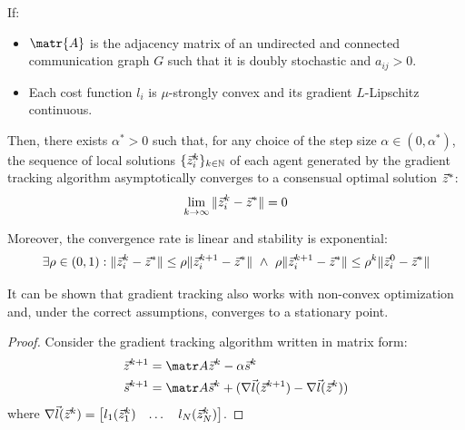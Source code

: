 \begin{description}



        \begin{theorem} 
            If:
            \begin{itemize}
                \item $\matr{A}$ is the adjacency matrix of an undirected and connected communication graph $G$ such that it is doubly stochastic and $a_{ij} > 0$.
                \item Each cost function $l_i$ is $\mu$-strongly convex and its gradient $L$-Lipschitz continuous.
            \end{itemize}
            Then, there exists $\alpha^* > 0$ such that, for any choice of the step size $\alpha \in (0, \alpha^*)$, the sequence of local solutions $\{ {\vec{z}}_i^k \}_{k \in \mathbb{N}}$ of each agent generated by the gradient tracking algorithm asymptotically converges to a consensual optimal solution ${\vec{z}}^*$:
            \[ \lim_{k \rightarrow \infty} \Vert {\vec{z}}_i^k - {\vec{z}}^* \Vert = 0 \]
            
            Moreover, the convergence rate is linear and stability is exponential:
            \[ 
                \exists \rho \in (0,1): \Vert {\vec{z}}_i^k - {\vec{z}}^* \Vert \leq \rho \Vert {\vec{z}}_i^{k+1} - {\vec{z}}^* \Vert
                \,\,\land\,\,
                \rho \Vert {\vec{z}}_i^{k+1} - {\vec{z}}^* \Vert \leq \rho^k \Vert {\vec{z}}_i^0 - {\vec{z}}^* \Vert
            \]

            {
                \indenttbox
                \begin{remark}
                    It can be shown that gradient tracking also works with non-convex optimization and, under the correct assumptions, converges to a stationary point. 
                \end{remark}
            }

            \begin{proof}
                Consider the gradient tracking algorithm written in matrix form:
                \[
                    \begin{aligned}
                        \z^{k+1} &= \A \z^k - \alpha \s^k \\
                        \s^{k+1} &= \A \s^k + (\nabla \vec{l}(\z^{k+1}) - \nabla \vec{l}(\z^k))
                    \end{aligned}
                \]
                where $\nabla \vec{l}({\vec{z}}^k) = \begin{bmatrix} l_1({\vec{z}}^k_1) & \dots & l_N({\vec{z}}^k_N) \end{bmatrix}$.


\end{proof}
\end{theorem}
\end{description}
